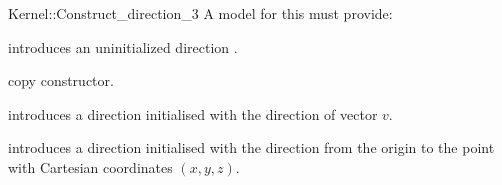 \begin{ccRefFunctionObjectConcept}{Kernel::Construct_direction_3}
A model for this must provide:



\ccHidden {}
             {introduces an uninitialized direction .}

\ccHidden {}
 	    {copy constructor.}

	    {introduces a direction  initialised with the 
	     direction of vector $v$.}

            {introduces a direction  initialised with the direction 
	     from the origin to the point with Cartesian coordinates $(x, y, z)$.}


\end{ccRefFunctionObjectConcept}

